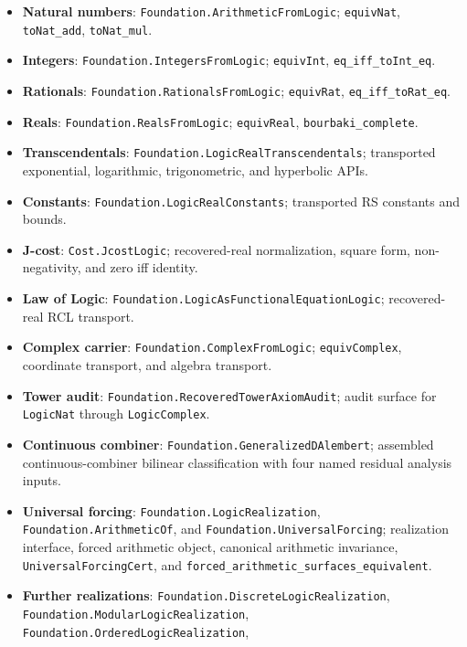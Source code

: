 \documentclass[11pt,a4paper]{article}
\theoremstyle{definition}
\theoremstyle{remark}
\begin{document}
\begingroup
\small
\sloppy
\begin{itemize}[leftmargin=2em]
\item \textbf{Natural numbers}: \texttt{Foundation.ArithmeticFromLogic};
      \texttt{equivNat}, \texttt{toNat\_add}, \texttt{toNat\_mul}.
\item \textbf{Integers}: \texttt{Foundation.IntegersFromLogic};
      \texttt{equivInt}, \texttt{eq\_iff\_toInt\_eq}.
\item \textbf{Rationals}: \texttt{Foundation.RationalsFromLogic};
      \texttt{equivRat}, \texttt{eq\_iff\_toRat\_eq}.
\item \textbf{Reals}: \texttt{Foundation.RealsFromLogic};
      \texttt{equivReal}, \texttt{bourbaki\_complete}.
\item \textbf{Transcendentals}: \texttt{Foundation.LogicRealTranscendentals};
      transported exponential, logarithmic, trigonometric, and hyperbolic APIs.
\item \textbf{Constants}: \texttt{Foundation.LogicRealConstants};
      transported RS constants and bounds.
\item \textbf{J-cost}: \texttt{Cost.JcostLogic};
      recovered-real normalization, square form, non-negativity, and zero
      iff identity.
\item \textbf{Law of Logic}: \texttt{Foundation.LogicAsFunctionalEquationLogic};
      recovered-real RCL transport.
\item \textbf{Complex carrier}: \texttt{Foundation.ComplexFromLogic};
      \texttt{equivComplex}, coordinate transport, and algebra transport.
\item \textbf{Tower audit}: \texttt{Foundation.RecoveredTowerAxiomAudit};
      audit surface for \texttt{LogicNat} through \texttt{LogicComplex}.
\item \textbf{Continuous combiner}: \texttt{Foundation.GeneralizedDAlembert};
      assembled continuous-combiner bilinear classification with four named
      residual analysis inputs.
\item \textbf{Universal forcing}: \texttt{Foundation.LogicRealization},
      \texttt{Foundation.ArithmeticOf}, and
      \texttt{Foundation.UniversalForcing}; realization interface,
      forced arithmetic object, canonical arithmetic invariance,
      \texttt{UniversalForcingCert}, and
      \texttt{forced\_arithmetic\_surfaces\_equivalent}.
\item \textbf{Further realizations}: \texttt{Foundation.DiscreteLogicRealization},
      \texttt{Foundation.ModularLogicRealization},
      \texttt{Foundation.OrderedLogicRealization},

\end{itemize}
\end{document}
